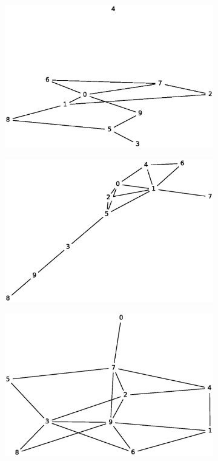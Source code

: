 \begin{figure}[h!]
     \centering
     \begin{subfigure}[b]{0.25\textwidth}
         \includegraphics[width=\columnwidth]{images/gnpes0.eps}
     \end{subfigure}
     \hspace{0.8em}
     \begin{subfigure}[b]{0.25\textwidth}
         \includegraphics[width=\columnwidth]{images/gnpes1.eps}
     \end{subfigure}
     \hspace{0.8em}
     \begin{subfigure}[b]{0.25\textwidth}
         \includegraphics[width=\columnwidth]{images/gnpes2.eps}

\end{subfigure}
\end{figure}
